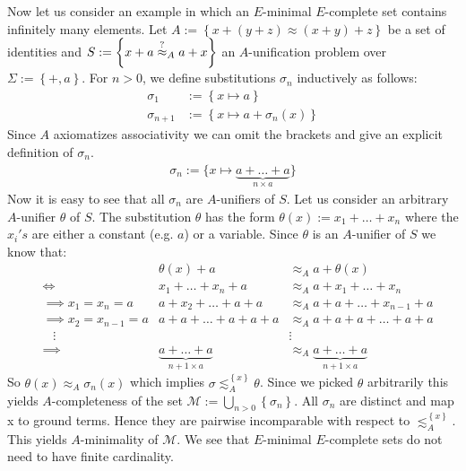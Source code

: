 Now let us consider an example in which an $E$-minimal $E$-complete set contains infinitely many elements. Let $A:=\left\lbrace x+(y+z)\approx (x+y)+z\right\rbrace $ be a set of identities and $S:=\left\lbrace x+a\stackrel{?}{\approx}_A a+x\right\rbrace$ an $A$-unification problem over $\Sigma:=\left\lbrace +,a\right\rbrace$. For $n>0$, we define substitutions $\sigma_n$ inductively as follows:
\begin{align*}
	\sigma_1     & :=\left\lbrace x\mapsto a\right\rbrace             \\
	\sigma_{n+1} & :=\left\lbrace x\mapsto a+\sigma_n(x)\right\rbrace 
\end{align*}
Since $A$ axiomatizes associativity we can omit the brackets and give an explicit definition of $\sigma_n$.
\begin{align*}
	\sigma_n:=\lbrace x\mapsto\underbrace{a+\dots+a}_{n\times a} \rbrace 
\end{align*}
Now it is easy to see that all $\sigma_n$ are $A$-unifiers of $S$.
Let us consider an arbitrary $A$-unifier $\theta$ of $S$. The substitution $\theta$ has the form $\theta(x):=x_1+\dots+x_n$ where the $x_i's$ are either a constant (e.g. $a$) or a variable.
Since $\theta$ is an $A$-unifier of $S$ we know that:
\begin{align*}
	  &                          & \theta(x)+a                          & \approx_A a+\theta(x)                          \\
	  & \iff                         & x_1+\dots+x_n+a                      & \approx_A a+x_1+\dots+x_n                      \\
	  & \implies x_1=x_n=a     & a+x_2+\dots+a+a              & \approx_A a+a+\dots+x_{n-1}+a              \\
	  & \implies x_2=x_{n-1}=a & a+a+\dots+a+a+a                      & \approx_A a+a+a+\dots+a+a                      \\
	  & \hspace{10pt}\vdots      &                                      & \vdots                                         \\
	  & \implies                 & \underbrace{a+\dots+a}_{n+1\times a} & \approx_A \underbrace{a+\dots+a}_{n+1\times a} 
\end{align*}
So $\theta(x)\approx_A\sigma_n(x)$ which implies $\sigma\lesssim^{\left\lbrace x\right\rbrace }_A\theta$.
Since we picked $\theta$ arbitrarily this yields $A$-completeness of the set $\mathcal{M}:=\bigcup_{n>0}\left\lbrace  \sigma_n\right\rbrace $.
All $\sigma_n$ are distinct and map x to ground terms. Hence they are pairwise incomparable with respect to $\lesssim^{\left\lbrace x\right\rbrace }_A$. This yields $A$-minimality of $\mathcal{M}$.
We see that $E$-minimal $E$-complete sets do not need to have finite cardinality.


